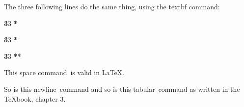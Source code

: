 \documentclass{amsart}
\begin{document}
The three following lines do the same thing, using the textbf command:

\textbf33 \textbf**

\textbf{3}3 \textbf **

\textbf 33 \textbf{*}*

This space command\ is valid in \LaTeX.

So is this newline\
command and so is this tabular\	command as written in the \TeX book, chapter 3.

\begin{comment}
Spellchecking woorks too
\end{comment}
\end{document}
